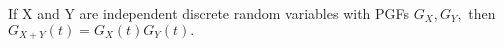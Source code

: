  If X and Y are independent discrete random variables
with PGFs $G_{X}, G_{Y},$  then $G_{X+Y}(t)=G_{X}(t)G_{Y}(t).$ 
